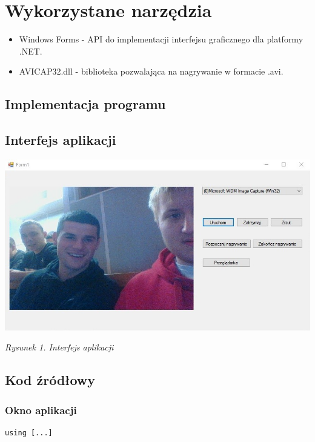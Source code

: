 \documentclass[12pt,a4paper,notitlepage]{report}
\begin{document}
\section{Wykorzystane narzędzia}
\begin{itemize}
\item Windows Forms - API do implementacji interfejsu graficznego dla platformy .NET.
\item AVICAP32.dll - biblioteka pozwalająca na nagrywanie w formacie .avi.
\end{itemize}
\begin{adjustwidth}{0pt}{-50pt}
\section{Implementacja programu}
\subsection{Interfejs aplikacji}
\noindent \includegraphics[scale=0.75]{okno}
\begin{center}
\begin{normalsize}
\textit{Rysunek 1. Interfejs aplikacji}
\end{normalsize}
\end{center}
\subsection{Kod źródłowy}
\subsubsection{Okno aplikacji}
\begin{lstlisting}
using [...]


\end{lstlisting}
\end{adjustwidth}
\end{document}
